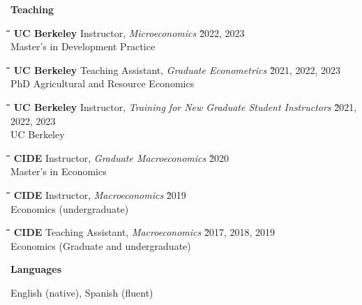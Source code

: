 \documentclass[10pt, oneside]{article}
\newcommand\mytabs{\hspace*{1cm}\=\hspace{1cm}\=\hspace{1cm}\=\hspace{1cm}\=\hspace{1cm}\=\hspace{1cm}\=\hspace{1cm}\=\hspace{1cm}\=\hspace{1cm}\=\hspace{1cm}}
\newenvironment{mysec}[1][\mytabs]
  {\begin{tabbing}#1\kill\ignorespaces}
  {\end{tabbing}}
\begin{document}
\begin{minipage}[t]{0.1\linewidth}
\textbf{Teaching}
\end{minipage}\hspace{0.05\linewidth}
\begin{minipage}[t]{0.8\linewidth}
\begin{mysec} 
    \textbf{UC Berkeley} \>\>\>Instructor, \emph{Microeconomics}  \` 2022, 2023 \\
    \>\>\> Master's in Development Practice
    \end{mysec}
\begin{mysec} 
\textbf{UC Berkeley} \>\>\>Teaching Assistant, \emph{Graduate Econometrics}  \` 2021, 2022, 2023 \\
\>\>\> PhD Agricultural and Resource Economics
\end{mysec}
\begin{mysec} 
\textbf{UC Berkeley} \>\>\>Instructor, \emph{Training for New Graduate Student Instructors}  \` 2021, 2022, 2023 \\
\>\>\> UC Berkeley 
\end{mysec}
\begin{mysec} 
    \textbf{CIDE} \>\>\>Instructor, \emph{Graduate Macroeconomics}  \` 2020 \\
    \>\>\> Master's in Economics 
\end{mysec}
\begin{mysec} 
    \textbf{CIDE} \>\>\>Instructor, \emph{Macroeconomics}  \` 2019 \\
    \>\>\> Economics (undergraduate)
\end{mysec}
\begin{mysec} 
    \textbf{CIDE} \>\>\>Teaching Assistant, \emph{Macroeconomics}  \` 2017, 2018, 2019 \\
    \>\>\> Economics (Graduate and undergraduate)
\end{mysec}
\end{minipage}\vspace{5mm}

\begin{minipage}[t]{0.1\linewidth}
\textbf{Languages}
\end{minipage}\hspace{0.05\linewidth}
\begin{minipage}[t]{0.8\linewidth}
English (native), Spanish (fluent)
\end{minipage}\vspace{5mm}
\end{document}
